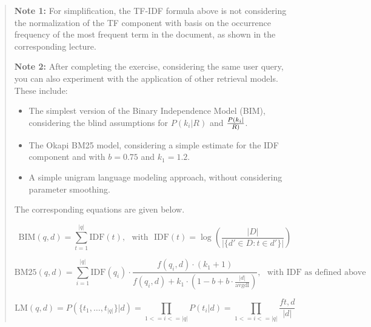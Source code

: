 \documentclass[12pt]{article}
\begin{document}
\begin{quote}
    \textbf{Note 1:} For simplification, the TF-IDF formula above is not considering the normalization of the TF component with basis on the occurrence frequency of the most frequent term in the document, as shown in the corresponding lecture.
    
    \textbf{Note 2:} After completing the exercise, considering the same user query, you can also experiment with the application of other retrieval models. These include:
    \begin{itemize}
    \item The simplest version of the Binary Independence Model (BIM), considering the blind assumptions for $P(k_i|R)$ and $P(k_i|\over{R})$.
    \item The Okapi BM25 model, considering a simple estimate for the IDF component and with $b=0.75$ and $k_1=1.2$.
    \item A simple unigram language modeling approach, without considering parameter smoothing.
    \end{itemize}
    The corresponding equations are given below.
    
    \begin{center}
    \begin{equation*}
	\mathrm{BIM}(q,d) = \sum _{t=1}^{|q|} \mathrm{IDF}(t), \text{~~with~~} \mathrm{IDF}(t) = \log \left( \frac{|D|}{|\{d' \in D: t \in d'\}|} \right)
	\end{equation*}
    \end{center}
    
    \begin{center}
    \begin{equation*}
{ {\text{BM25}}(q,d)=\sum _{i=1}^{|q|}{\text{IDF}}(q_{i})\cdot {\frac {f(q_{i},d)\cdot (k_{1}+1)}{f(q_{i},d)+k_{1}\cdot \left(1-b+b\cdot {\frac {|d|}{\text{avgdl}}}\right)}},} \text{~~with IDF as defined above}
    \end{equation*}
    \end{center}
    
    \begin{center}
    \begin{equation*}
	\mathrm{LM}(q,d) = P(\{t_1,\ldots,t_{|q|}\}|d) = \prod_{1<=i<=|q|} P(t_i|d) = \prod_{1<=i<=|q|} \frac{f{t,d}}{|d|}
	\end{equation*}
    \end{center}
\end{quote}
\end{document}
